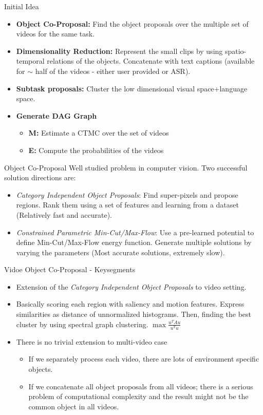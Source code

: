 \begin{frame}{Initial Idea}
\begin{itemize}
\item {\bf Object Co-Proposal:} Find the object proposals over the multiple set of videos for the same task.
\item {\bf Dimensionality Reduction:} Represent the small clips by using spatio-temporal relations of the objects. Concatenate with text captions (available for $\sim$ half of the videos - either user provided or ASR).
\item {\bf Subtask proposals:} Cluster the low dimensional visual space+language space.
\item {\bf Generate DAG Graph}
\begin{itemize}
\item {\bf M:} Estimate a CTMC over the set of videos
\item {\bf E:} Compute the probabilities of the videos
\end{itemize}
\end{itemize}
\end{frame}

\begin{frame}{Object Co-Proposal}
Well studied problem in computer vision. Two successful solution directions are:
\begin{itemize}
\item \emph{Category Independent Object Proposals}: Find super-pixels and propose regions. Rank them using a set of features and learning from a dataset (Relatively fast and accurate).
\item \emph{Constrained Parametric Min-Cut/Max-Flow}: Use a pre-learned potential to define Min-Cut/Max-Flow energy function. Generate multiple solutions by varying the parameters (Most accurate solutions, extremely slow).
\end{itemize}
\end{frame}

\begin{frame}{Vidoe Object Co-Proposal - Keysegments}
\begin{itemize}
\item Extension of the \emph{Category Independent Object Proposals} to video setting.
\item Basically scoring each region with saliency and motion features. Express similarities as distance of unnormalized histograms. Then, finding the best cluster by using spectral graph clustering. $\max \frac{u^TAu}{u^Tu}$
\item There is no trivial extension to multi-video case
\begin{itemize}
\item If we separately process each video, there are lots of environment specific objects.
\item If we concatenate all object proposals from all videos; there is a serious problem of computational complexity and the result might not be the common object in all videos.
\end{itemize}
\end{itemize}
\end{frame}

